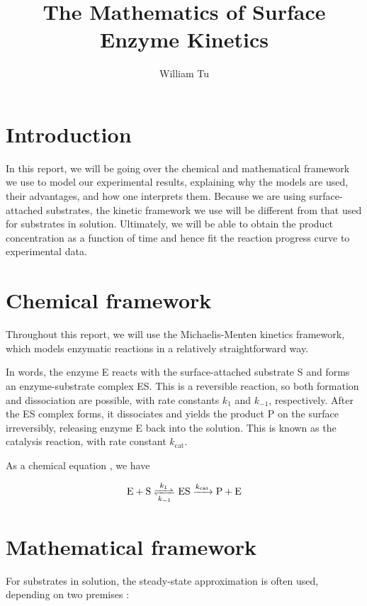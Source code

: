 \documentclass{article}
\title{The Mathematics of Surface Enzyme Kinetics}
\author{William Tu}
\date{}
\newcommand{\kcat}{k_{\text{cat}}}
\begin{document}
\maketitle

\section{Introduction} \label{section:1}

In this report, we will be going over the chemical and mathematical framework we use to model our experimental results, explaining why the models are used, their advantages, and how one interprets them. Because we are using surface-attached substrates, the kinetic framework we use will be different from that used for substrates in solution. Ultimately, we will be able to obtain the product concentration as a function of time and hence fit the reaction progress curve to experimental data.

\section{Chemical framework} \label{section:2}

Throughout this report, we will use the Michaelis-Menten kinetics framework, which models enzymatic reactions in a relatively straightforward way. 

In words, the enzyme E reacts with the surface-attached substrate S and forms an enzyme-substrate complex ES. This is a reversible reaction, so both formation and dissociation are possible, with rate constants $k_1$ and $k_{-1}$, respectively. After the ES complex forms, it dissociates and yields the product P on the surface irreversibly, releasing enzyme E back into the solution. This is known as the catalysis reaction, with rate constant $\kcat$.

As a chemical equation \cite{wiki:michaelis}, we have

\begin{equation}
    \ce{E + S <=>[$k_1$][$k_{-1}$] ES ->[$\kcat$] P + E}
    \label{chem:reaction1}
\end{equation}

\section{Mathematical framework} \label{section:3}

For substrates in solution, the steady-state approximation is often used,  depending on two premises \cite{annedemaille12}:
\end{document}
